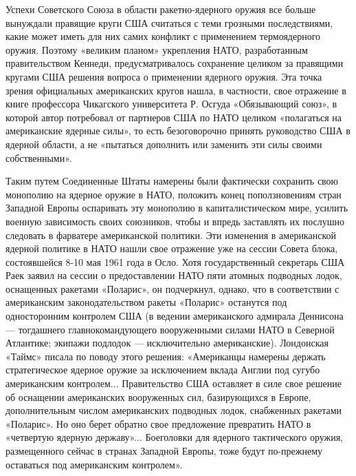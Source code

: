 \documentclass[12pt, a4paper, openany]{book}
\begin{document}
Успехи Советского Союза в области ракетно-ядерного оружия все больше вынуждали правящие круги США считаться с теми грозными последствиями, какие может иметь для них самих конфликт с применением термоядерного оружия. Поэтому «великим планом» укрепления НАТО, разработанным правительством Кеннеди, предусматривалось сохранение целиком за правящими кругами США решения вопроса о применении ядерного оружия. Эта точка зрения официальных американских кругов нашла, в частности, свое отражение в книге профессора Чикагского университета Р. Осгуда «Обязывающий союз», в которой автор потребовал от партнеров США по НАТО целиком «полагаться на американские ядерные силы», то есть безоговорочно принять руководство США в ядерной области, а не «пытаться дополнить или заменить эти силы своими собственными».
	
Таким путем Соединенные Штаты намерены были фактически сохранить свою монополию на ядерное оружие в НАТО, положить конец поползновениям стран Западной Европы оспаривать эту монополию в капиталистическом мире, усилить военную зависимость своих союзников, чтобы и впредь заставлять их послушно следовать в фарватере американской политики. Эти изменения в американской ядерной политике в НАТО нашли свое отражение уже на сессии Совета блока, состоявшейся 8-10 мая 1961 года в Осло. Хотя государственный секретарь США Раек заявил на сессии о предоставлении НАТО пяти атомных подводных лодок, оснащенных ракетами «Поларис», он подчеркнул, однако, что в соответствии с американским законодательством ракеты «Поларис» останутся под односторонним контролем США (в ведении американского адмирала Деннисона — тогдашнего главнокомандующего вооруженными силами НАТО в Северной Атлантике; экипажи подлодок — исключительно американские). Лондонская «Таймс» писала по поводу этого решения: «Американцы намерены держать стратегическое ядерное оружие за исключением вклада Англии под сугубо американским контролем... Правительство США оставляет в силе свое решение об оснащении американских вооруженных сил, базирующихся в Европе, дополнительным числом американских подводных лодок, снабженных ракетами «Поларис». Но оно берет обратно свое предложение превратить НАТО в «четвертую ядерную державу»... Боеголовки для ядерного тактического оружия, размещенного сейчас в странах Западной Европы, тоже будут по-прежнему оставаться под американским контролем».
	
\end{document}
